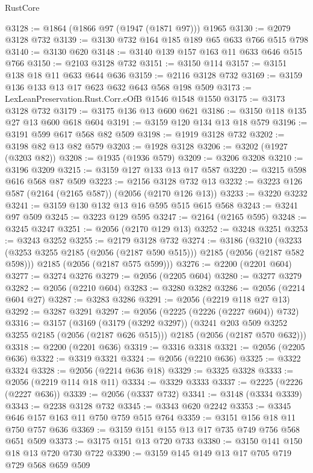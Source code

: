 \begin{lexlean}{RustCore}
\begin{coremodule}
@3128 := @1864 (@1866 @97 (@1947 (@1871 @97))) @1965
@3130 := @2079 @3128 @732
@3139 := @3130 @732 @164 @185 @189 @65 @633 @766 @515 @798
@3140 := @3130 @620
@3148 := @3140 @139 @157 @163 @11 @633 @646 @515 @766
@3150 := @2103 @3128 @732
@3151 := @3150 @114
@3157 := @3151 @138 @18 @11 @633 @644 @636
@3159 := @2116 @3128 @732
@3169 := @3159 @136 @133 @13 @17 @623 @632 @643 @568 @198 @509
@3173 := LexLeanPreservation.Rust.Corr.eOfB @1546 @1548 @1550
@3175 := @3173 @3128 @732
@3179 := @3175 @136 @13 @600 @621
@3186 := @3150 @118 @135 @27 @13 @600 @618 @604
@3191 := @3159 @120 @134 @13 @18 @579
@3196 := @3191 @599 @617 @568 @82 @509
@3198 := @1919 @3128 @732
@3202 := @3198 @82 @13 @82 @579
@3203 := @1928 @3128
@3206 := @3202 (@1927 (@3203 @82))
@3208 := @1935 (@1936 @579)
@3209 := @3206 @3208
@3210 := @3196 @3209
@3215 := @3159 @127 @133 @13 @17 @587
@3220 := @3215 @598 @616 @568 @87 @509
@3223 := @2156 @3128 @732 @13
@3232 := @3223 @126 @587 (@2164 (@2165 @587)) (@2056 (@2170 @126 @13))
@3233 := @3220 @3232
@3241 := @3159 @130 @132 @13 @16 @595 @515 @615 @568
@3243 := @3241 @97 @509
@3245 := @3223 @129 @595
@3247 := @2164 (@2165 @595)
@3248 := @3245 @3247
@3251 := @2056 (@2170 @129 @13)
@3252 := @3248 @3251
@3253 := @3243 @3252
@3255 := @2179 @3128 @732
@3274 := @3186
    (@3210
      (@3233 (@3253 @3255 @2185 (@2056 (@2187 @590 @515))) @2185 (@2056 (@2187 @582 @598)))
      @2185
      (@2056 (@2187 @575 @599)))
@3276 := @2200 (@2201 @604)
@3277 := @3274 @3276
@3279 := @2056 (@2205 @604)
@3280 := @3277 @3279
@3282 := @2056 (@2210 @604)
@3283 := @3280 @3282
@3286 := @2056 (@2214 @604 @27)
@3287 := @3283 @3286
@3291 := @2056 (@2219 @118 @27 @13)
@3292 := @3287 @3291
@3297 := @2056 (@2225 (@2226 (@2227 @604)) @732)
@3316 := @3157
    (@3169
      (@3179 (@3292 @3297))
      (@3241 @203 @509 @3252 @3255 @2185 (@2056 (@2187 @626 @515)))
      @2185
      (@2056 (@2187 @570 @632)))
@3318 := @2200 (@2201 @636)
@3319 := @3316 @3318
@3321 := @2056 (@2205 @636)
@3322 := @3319 @3321
@3324 := @2056 (@2210 @636)
@3325 := @3322 @3324
@3328 := @2056 (@2214 @636 @18)
@3329 := @3325 @3328
@3333 := @2056 (@2219 @114 @18 @11)
@3334 := @3329 @3333
@3337 := @2225 (@2226 (@2227 @636))
@3339 := @2056 (@3337 @732)
@3341 := @3148 (@3334 @3339)
@3343 := @2238 @3128 @732
@3345 := @3343 @620 @2242
@3353 := @3345 @646 @157 @163 @11 @750 @759 @515 @764
@3359 := @3151 @156 @18 @11 @750 @757 @636
@3369 := @3159 @151 @155 @13 @17 @735 @749 @756 @568 @651 @509
@3373 := @3175 @151 @13 @720 @733
@3380 := @3150 @141 @150 @18 @13 @720 @730 @722
@3390 := @3159 @145 @149 @13 @17 @705 @719 @729 @568 @659 @509

\end{coremodule}
\end{lexlean}

